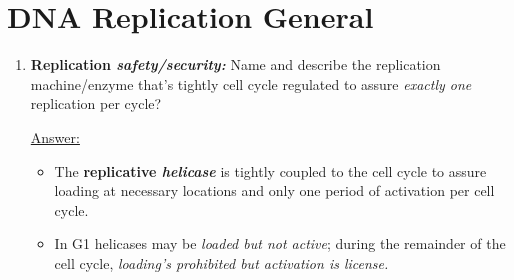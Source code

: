 \documentclass{article}
\newenvironment{QandA}{\begin{enumerate}[label=\bfseries Q\arabic*.]}
                       {\end{enumerate}}
\newenvironment{answered}{\par\normalfont\underline{Answer:}}{}
\begin{document}
\section{DNA Replication General}
\begin{QandA}
  \item{\textbf{Replication \textit{safety/security:}} Name and describe the replication machine/enzyme that's tightly cell cycle regulated to assure \textit{exactly one} replication per cycle?}
    \begin{answered}
    \begin{itemize}
      \item{The \textbf{replicative \textit{helicase}} is tightly coupled to the cell cycle to assure loading at necessary locations and only one period of activation per cell cycle.}
      \item{In G1 helicases may be \textit{loaded but not active}; during the remainder of the cell cycle, \textit{loading's prohibited but activation is license.}}
    \end{itemize}
    \end{answered}
\end{QandA}
\end{document}
